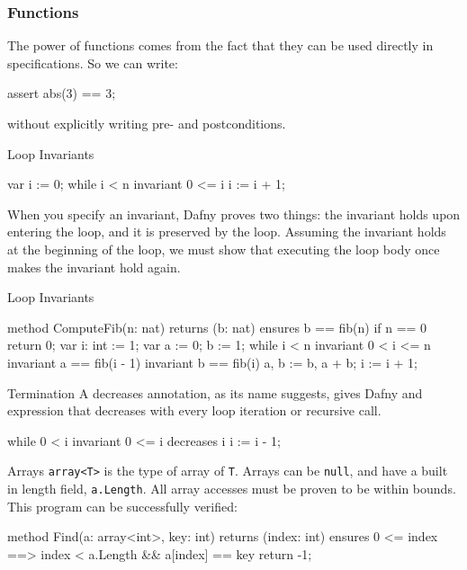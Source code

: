 \documentclass[10pt, compress]{beamer}
\begin{document}
\begin{frame}[fragile]
  \frametitle{Functions}
The power of functions comes from the fact that they can be used directly in specifications. So we can write:
  \begin{verbnobox}[\footnotesize]
assert abs(3) == 3;
  \end{verbnobox}
without explicitly writing pre- and postconditions.

\end{frame}

\begin{frame}[fragile]{Loop Invariants}

  \begin{verbnobox}[\footnotesize]
var i := 0;
while i < n
   invariant 0 <= i
{
   i := i + 1;
}
  \end{verbnobox}
When you specify an invariant, Dafny proves two things: the invariant holds upon entering the loop, and it is preserved by the loop.
Assuming the invariant holds at the beginning of the loop, we must show that executing the loop body once makes the invariant hold again.
\end{frame}

\begin{frame}[fragile]{Loop Invariants}
  \begin{verbnobox}[\footnotesize]
method ComputeFib(n: nat) returns (b: nat)
   ensures b == fib(n)
{
   if n == 0 { return 0; }
   var i: int := 1;
   var a := 0;
       b := 1;
   while i < n
      invariant 0 < i <= n
      invariant a == fib(i - 1)
      invariant b == fib(i)
   {
      a, b := b, a + b;
      i := i + 1;
   }
}
  \end{verbnobox}
\end{frame}

\begin{frame}[fragile]{Termination}
A decreases annotation, as its name suggests, gives Dafny and expression that decreases with every loop iteration or recursive call.
  \begin{verbnobox}[\footnotesize]
while 0 < i
   invariant 0 <= i
   decreases i
{
   i := i - 1;
}
  \end{verbnobox}
\end{frame}

\begin{frame}[fragile]{Arrays}
  \verb|array<T>| is the type of array of \verb|T|. Arrays can be \verb|null|, and have a built in length field, \verb|a.Length|.
  All array accesses must be proven to be within bounds.
  This program can be successfully verified:
  \begin{verbnobox}[\footnotesize]
method Find(a: array<int>, key: int) returns (index: int)
   ensures 0 <= index ==> index < a.Length && a[index] == key
{
  return -1;
}
  \end{verbnobox}
\end{frame}
\end{document}

